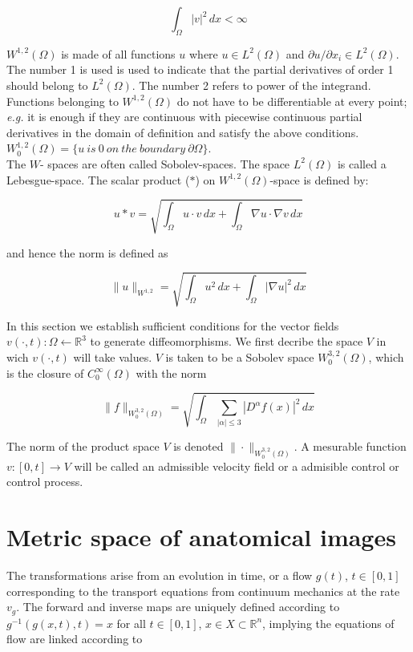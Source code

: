 \documentclass[final, paper=letter,5p,times,twocolumn]{elsarticle}
\theoremstyle{definition}
\begin{document}
{$$
\int_{\Omega} |v|^{2} \, dx < \infty
$$

$W^{1,2}(\Omega)$ is made of all functions $u$ where $u \in L^{2}(\Omega)$ and $\partial u / \partial x_{i} \in L^{2}(\Omega)$. The number 1 is used is used to indicate that the partial derivatives of order 1 should belong to $L^{2}(\Omega)$. The number 2 refers to power of the integrand. Functions belonging to $W^{1,2}(\Omega)$ do not have to be differentiable at every point; {\it e.g.} it is enough if they are continuous with piecewise continuous partial derivatives in the domain of definition and satisfy the above conditions. $W^{1,2}_{0}(\Omega) = \{ u~is~0~on~the~boundary~\partial \Omega\}$.\\

The $W$- spaces are often called Sobolev-spaces. The space $L^{2}(\Omega)$ is called a Lebesgue-space.
The scalar product ($*$) on $W^{1,2}(\Omega)$-space is defined by:

$$
u*v = \sqrt{\int_{\Omega} u \cdot v \, dx + \int_{\Omega} \nabla u \cdot \nabla v \, dx}
$$

and hence the norm is defined as

$$
\| u \|_{W^{1,2}}= \sqrt{\int_{\Omega} u^{2} \, dx + \int_{\Omega} |\nabla u|^{2} \, dx}
$$

In this section we establish sufficient conditions for the vector fields $v(\cdot,t):\Omega \leftarrow \mathbb{R}^{3}$ to generate diffeomorphisms. We first decribe the space $V$ in wich $v(\cdot,t)$ will take values. $V$ is taken to be a Sobolev space $W_{0}^{3,2}(\Omega)$, which is the closure of $C_{0}^{\infty}(\Omega)$ with the norm

$$
\| f \|_{W_{0}^{3,2}(\Omega)} = \sqrt{\int_{\Omega} \sum_{| \alpha | \le 3 } |D^{\alpha} f(x)|^{2} \, dx }
$$

The norm of the product space $V$ is denoted $\| \cdot \|_{W_{0}^{3,2}(\Omega)}$. A mesurable function $v:[0,t] \rightarrow V$ will be called an admissible velocity field or a admisible control or control process.

\section{Metric space of anatomical images}

The transformations arise from an evolution in time, or a flow $g(t)$, $t \in [0, 1]$ corresponding to the transport equations from continuum mechanics at the rate $v_{g}$. The forward and inverse maps are uniquely defined according to $g^{-1}(g(x, t), t) = x$ for all $t \in [0, 1]$, $x \in X \subset \mathbb{R}^{n}$, implying the equations of flow are linked according to

}
\end{document}
